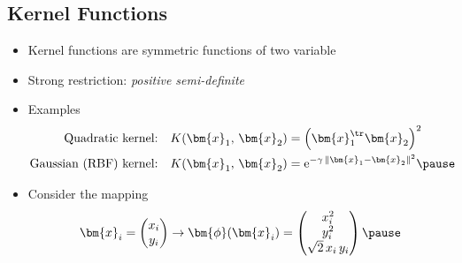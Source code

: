 \begin{slide}
\section[-2]{Kernel Functions}

\begin{PauseHighLight}
  \begin{itemize}
  \item Kernel functions are symmetric functions of two variable\pause
  \item Strong restriction: \textit{positive semi-definite}\pause
  \item Examples
    \begin{align*}
      \mbox{Quadratic kernel:}&& K(\bm{x}_1,\,\bm{x}_2)&=
      \left(\bm{x}_1^\tr\bm{x}_2\right)^2 \\
      \mbox{Gaussian (RBF) kernel:}&& K(\bm{x}_1,\,\bm{x}_2)&=
      \mathrm{e}^{-\gamma\,\|\bm{x}_1-\bm{x}_2\|^2}\pause
    \end{align*}
  \item Consider the mapping
    \begin{align*}
      \bm{x}_i =
      \begin{pmatrix}
        x_i \\ y_i
      \end{pmatrix}
      \rightarrow
      \bm{\phi}(\bm{x}_i) =
      \begin{pmatrix}
        x_i^2 \\ y_i^2 \\ \sqrt{2}\,x_i\,y_i 
      \end{pmatrix}\pause
    \end{align*}
  \end{itemize}
\end{PauseHighLight}

\end{slide}



